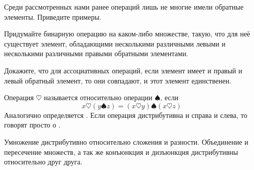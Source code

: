 \begin{exercise}
Среди рассмотренных нами ранее операций лишь не многие имели обратные элементы. Приведите примеры.
\end{exercise}

\begin{exercise}
Придумайте бинарную операцию на каком-либо множестве, такую, что для неё существует элемент, обладающими несколькими различными левыми и несколькими различными правыми обратными элементами.
\end{exercise}

\begin{exercise}
Докажите, что для ассоциативных операций, если элемент имеет и правый и левый обратный элемент, то они совпадают, и этот элемент единственен.
\end{exercise}

\begin{definition}
Операция $\heartsuit$ называется  относительно операции $\spadesuit$, если
$$x\heartsuit (y\spadesuit z) = (x\heartsuit y) \spadesuit (x \heartsuit z)$$
Аналогично определяется . Если операция дистрибутивна и справа и слева, то говорят просто о .
\end{definition}

\begin{example}
Умножение дистрибутивно относительно сложения и разности. Объединение и пересечение множеств, а так же конъюнкция и дизъюнкция дистрибутивны относительно друг друга.
\end{example}